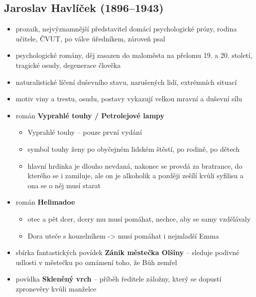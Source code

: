 \subsection{Jaroslav Havlíček (1896--1943)}
\begin{itemize}
\item prozaik, nejvýznamnější představitel domácí psychologické prózy, rodina učitele, ČVUT, po válce úředníkem, zároveň psal
\item psychologické romány, děj zasazen do maloměsta na přelomu 19. a 20. století, tragické osudy, degenerace člověka
\item naturalistické líčení duševního stavu, narušených lidí, extrémních situací
\item motiv viny a trestu, osudu, postavy vykazují velkou mravní a duševní sílu
\item román \textbf{Vyprahlé touhy / Petrolejové lampy}
	\begin{itemize}
	\item Vyprahlé touhy -- pouze první vydání
	\item symbol touhy ženy po obyčejném lidském štěstí, po rodině, po dětech
	\item hlavní hrdinka je dlouho nevdaná, nakonec se provdá za bratrance, do kterého se i zamiluje, ale on je alkoholik a později zešílí kvůli syfilisu a ona se o něj musí starat
	\end{itemize}
	
\item román \textbf{Helimadoe}
	\begin{itemize}
	\item otec a pět dcer, dcery mu musí pomáhat, nechce, aby se samy vzdělávaly
	\item Dora uteče s kouzelníkem -> musí pomáhat i nejmladší Emma
	\end{itemize}
	
\item sbírka fantastických povídek \textbf{Zánik městečka Olšiny} -- sleduje podivné udlosti v městečku po oznámení toho, že Bůh zemřel

\item povídka \textbf{Skleněný vrch} -- příběh ředitele záložny, který se dopustí zpronevěry kvůli manželce
\end{itemize}

